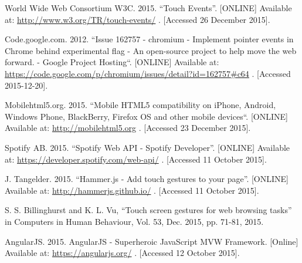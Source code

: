 \documentclass[conference]{IEEEtran}
\begin{document}
%
%
%
\begin{thebibliography}{1}


World Wide Web Consortium W3C. 2015. ``Touch Events''. [ONLINE] Available at: \url{http://www.w3.org/TR/touch-events/} . [Accessed 26 December 2015].

  
Code.google.com. 2012. ``Issue 162757 -  chromium -  Implement pointer events in Chrome behind experimental flag -  An open-source project to help move the web forward. - Google Project Hosting``. [ONLINE] Available at: \url{https://code.google.com/p/chromium/issues/detail?id=162757#c64} . [Accessed 2015-12-20].


  
Mobilehtml5.org. 2015. ``Mobile HTML5 compatibility on iPhone, Android, Windows Phone, BlackBerry, Firefox OS and other mobile devices``. [ONLINE] Available at: \url{http://mobilehtml5.org} . [Accessed 23 December 2015].

Spotify AB. 2015. ``Spotify Web API - Spotify Developer''. [ONLINE] Available at: \url{https://developer.spotify.com/web-api/} . [Accessed 11 October 2015].

J. Tangelder. 2015. ``Hammer.js - Add touch gestures to your page''. [ONLINE] Available at: \url{http://hammerjs.github.io/} . [Accessed 11 October 2015].

S. S. Billinghurst and K. L. Vu, ``Touch screen gestures for web browsing tasks'' in Computers in Human Behaviour, Vol. 53, Dec. 2015, pp. 71-81, 2015.

AngularJS. 2015. AngularJS - Superheroic JavaScript MVW Framework. [Online] Available at: \url{https://angularjs.org/} . [Accessed 12 October 2015].


\end{thebibliography}
\end{document}
